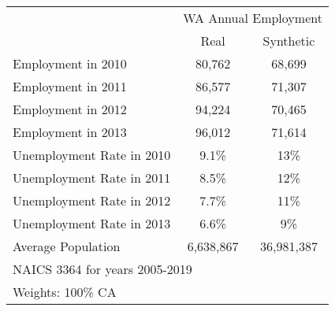 {
\def\sym#1{\ifmmode^{#1}\else\(^{#1}\)\fi}
\begin{tabular}{l*{1}{cc}}
\hline\hline
            &\multicolumn{2}{c}{WA Annual Employment} \\
            &     Real&         Synthetic\\
\hline
Employment in 2010 &    80,762&       68,699\\

Employment in 2011 &    86,577&       71,307\\

Employment in 2012&    94,224&       70,465\\

Employment in 2013&     96,012&     71,614\\

Unemployment Rate in 2010&     9.1\%&     13\%\\

Unemployment Rate in 2011&     8.5\%&     12\%\\

Unemployment Rate in 2012&     7.7\%&     11\%\\

Unemployment Rate in 2013&     6.6\%&     9\%\\

Average Population& 6,638,867 & 36,981,387 \\

\hline\hline
\multicolumn{3}{l}{\footnotesize NAICS 3364 for years 2005-2019}\\
\multicolumn{3}{l}{\footnotesize Weights: 100\% CA}\\
\end{tabular}
}
